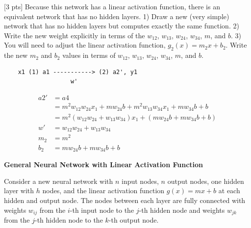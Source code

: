 \newpage

\begin{question}{[3 pts]}
Because this network has a linear activation function, there is an equivalent network that has no hidden layers. 1) Draw a new (very simple) network that has no hidden layers but computes exactly the same function. 2) Write the new weight explicitly in terms of the $w_{12}$, $w_{13}$, $w_{24}$, $w_{34}$, $m$, and $b$. 3) You will need to adjust the linear activation function, $g_2(x) = m_2x + b_2$. Write the new $m_2$ and $b_2$ values in terms of $w_{12}$, $w_{13}$, $w_{24}$, $w_{34}$, $m$, and $b$.

\begin{minipage}{\textwidth}
    \solution{} {\begin{verbatim}
    x1 (1) a1 -----------> (2) a2', y1
                   w'
    \end{verbatim}
    \begin{align*}
    a2' &= a4\\
    &= m^2w_{12}w_{24}x_1+mw_{24}b+m^2w_{13}w_{34}x_1+mw_{34}b+b\\
    &= m^2(w_{12}w_{24}+w_{13}w_{34})x_1 + (mw_{24}b+mw_{34}b+b)\\
    w' &= w_{12}w_{24}+w_{13}w_{34}\\
    m_2 &= m^2\\
    b_2 &= mw_{24}b+mw_{34}b+b
    \end{align*}
    }
\end{minipage}
\end{question}

\textbf{General Neural Network with Linear Activation Function}

\vspace{3mm}
Consider a new neural network with $n$ input nodes, $n$ output nodes, one hidden layer with $h$ nodes, and the linear activation function $g(x) = mx + b$ at each hidden and output node. The nodes between each layer are fully connected with weights $w_{ij}$ from the $i$-th input node to the $j$-th hidden node and weights $w_{jk}$ from the $j$-th hidden node to the $k$-th output node.

